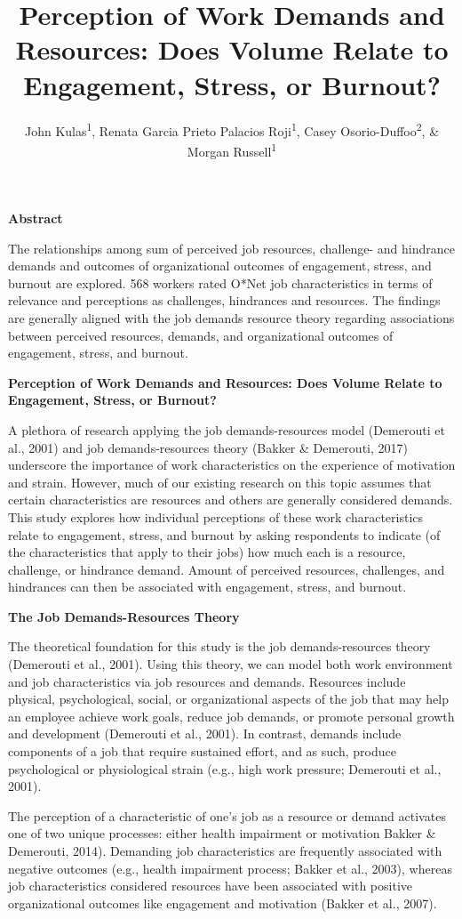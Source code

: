 \documentclass[
  man]{apa6}
\title{Perception of Work Demands and Resources: Does Volume Relate to Engagement, Stress, or Burnout?}
\author{John Kulas\textsuperscript{1}, Renata Garcia Prieto Palacios Roji\textsuperscript{1}, Casey Osorio-Duffoo\textsuperscript{2}, \& Morgan Russell\textsuperscript{1}}
\date{}
\affiliation{\vspace{0.5cm}\textsuperscript{1} Montclair State University\\\textsuperscript{2} Harver}
\begin{document}
\maketitle

\textbf{Abstract}

The relationships among sum of perceived job resources, challenge- and hindrance demands and outcomes of organizational outcomes of engagement, stress, and burnout are explored. 568 workers rated O*Net job characteristics in terms of relevance and perceptions as challenges, hindrances and resources. The findings are generally aligned with the job demands resource theory regarding associations between perceived resources, demands, and organizational outcomes of engagement, stress, and burnout.

\textbf{Perception of Work Demands and Resources: Does Volume Relate to Engagement, Stress, or Burnout?}

A plethora of research applying the job demands-resources model (Demerouti et al., 2001) and job demands-resources theory (Bakker \& Demerouti, 2017) underscore the importance of work characteristics on the experience of motivation and strain. However, much of our existing research on this topic assumes that certain characteristics are resources and others are generally considered demands. This study explores how individual perceptions of these work characteristics relate to engagement, stress, and burnout by asking respondents to indicate (of the characteristics that apply to their jobs) how much each is a resource, challenge, or hindrance demand. Amount of perceived resources, challenges, and hindrances can then be associated with engagement, stress, and burnout.

\textbf{The Job Demands-Resources Theory}

The theoretical foundation for this study is the job demands-resources theory (Demerouti et al., 2001). Using this theory, we can model both work environment and job characteristics via job resources and demands. Resources include physical, psychological, social, or organizational aspects of the job that may help an employee achieve work goals, reduce job demands, or promote personal growth and development (Demerouti et al., 2001). In contrast, demands include components of a job that require sustained effort, and as such, produce psychological or physiological strain (e.g., high work pressure; Demerouti et al., 2001).

The perception of a characteristic of one's job as a resource or demand activates one of two unique processes: either health impairment or motivation Bakker \& Demerouti, 2014). Demanding job characteristics are frequently associated with negative outcomes (e.g., health impairment process; Bakker et al., 2003), whereas job characteristics considered resources have been associated with positive organizational outcomes like engagement and motivation (Bakker et al., 2007).
\end{document}
